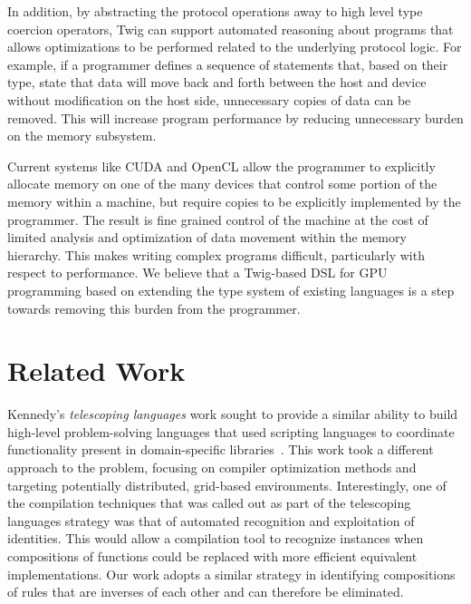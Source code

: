 \documentclass{acm_proc_article-sp}
\begin{document}
In addition, by abstracting the protocol operations away to high level type
coercion operators, Twig can support automated reasoning about programs that
allows optimizations to be performed related to the underlying protocol logic.
For example, if a programmer defines a sequence of statements that, based on
their type, state that data will move back and forth between the host and
device without modification on the host side, unnecessary copies of data can
be removed. This will increase program performance by reducing unnecessary
burden on the memory subsystem.

Current systems like CUDA and OpenCL allow the programmer to explicitly
allocate memory on one of the many devices that control some portion of the
memory within a machine, but require copies to be explicitly implemented by
the programmer. The result is fine grained control of the machine at the cost
of limited analysis and optimization of data movement within the memory
hierarchy. This makes writing complex programs difficult, particularly with
respect to performance. We believe that a Twig-based DSL for GPU programming
based on extending the type system of existing languages is a step towards
removing this burden from the programmer.

\section{Related Work}

Kennedy's \emph{telescoping languages} work sought to provide a similar
ability to build high-level problem-solving languages that used scripting languages
to coordinate functionality present in domain-specific libraries~\cite{kennedy00telescoping}.  This work took a different approach to
the problem, focusing on compiler optimization methods and targeting potentially
distributed, grid-based environments.  Interestingly, one of the compilation
techniques that was called out as part of the telescoping languages strategy was
that of automated recognition and exploitation of identities.  This would allow
a compilation tool to recognize instances when compositions of functions could 
be replaced with more efficient equivalent implementations.  Our work adopts a
similar strategy in identifying compositions of rules that are inverses of each
other and can therefore be eliminated.
\end{document}
